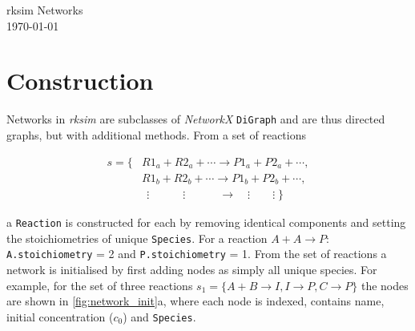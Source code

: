 \documentclass[9.5pt]{article}
\newcommand{\code}[1]{\texttt{#1}}
\begin{document}
	
\begin{titlepage}
	\vspace*{\fill}
	\begin{center}
		{\huge rksim Networks}\\
		\today
	\end{center}
	\vspace*{\fill}

\end{titlepage}	
\newpage

\section{Construction}

Networks in \emph{rksim} are subclasses of \emph{NetworkX} \code{DiGraph} and are thus directed graphs, but with additional methods. From a set of reactions 

\begin{equation}
\begin{aligned}
s = \{
        & R1_a + R2_a + \cdots \rightarrow P1_a + P2_a + \cdots, \\
        & R1_b + R2_b + \cdots \rightarrow P1_b + P2_b + \cdots, \\
        &\;\,\vdots\quad   \qquad\vdots\qquad\quad \rightarrow\quad \vdots \qquad \vdots\; 
\}
\end{aligned}
\end{equation}

a \code{Reaction} is constructed for each by removing identical components and setting the stoichiometries of unique \code{Species}. For a reaction $A + A  \rightarrow P$: \code{A.stoichiometry} = 2 and \code{P.stoichiometry} = 1. From the set of reactions a network is initialised by first adding nodes as simply all unique species. For example, for the set of three reactions $s_1 = \{A + B \rightarrow I, I \rightarrow P, C \rightarrow P\}$ the nodes are shown in \figurename{ \ref{fig:network_init}a}, where each node is indexed, contains name, initial concentration ($c_0$) and \code{Species}.
\end{document}
